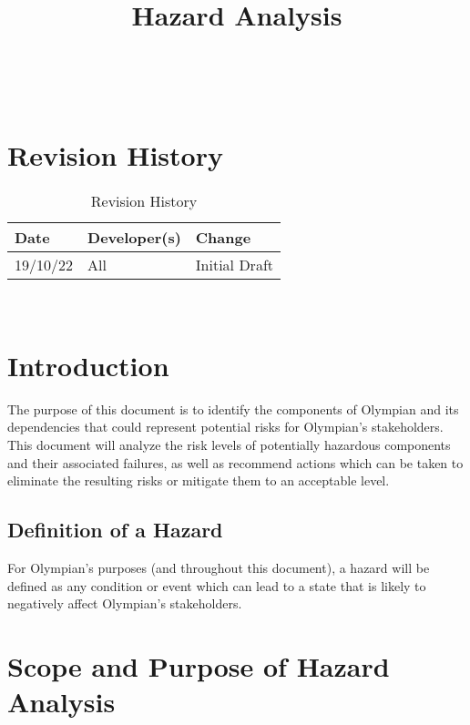 \documentclass{article}
\title{Hazard Analysis\\\progname}
\author{\authname}
\date{}
\begin{document}
	
	\maketitle
	\thispagestyle{empty}
	
	~\newpage
	

	\tableofcontents

	\newpage

	\section{Revision History}
	
	\begin{table}[hp]
		\caption{Revision History} \label{TblRevisionHistory}
		\begin{tabularx}{\textwidth}{llX}
			\toprule
			\textbf{Date} & \textbf{Developer(s)} & \textbf{Change}\\
			\midrule
			19/10/22 & All & Initial Draft\\
			\bottomrule
		\end{tabularx}
	\end{table}
	
	~\newpage
	
	
	\section{Introduction}
	
	The purpose of this document is to identify the components of Olympian and its dependencies that could represent potential risks for Olympian's stakeholders. This document will analyze the risk levels of potentially hazardous components and their associated failures, as well as recommend actions which can be taken to eliminate the resulting risks or mitigate them to an acceptable level.
	
	\subsection{Definition of a Hazard}
	For Olympian's purposes (and throughout this document), a hazard will be defined as any condition or event which can lead to a state that is likely to negatively affect Olympian's stakeholders.
	
	\section{Scope and Purpose of Hazard Analysis}
\end{document}
